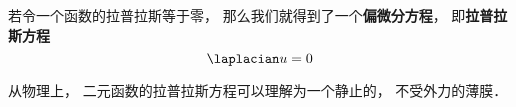 

若令一个函数的拉普拉斯等于零， 那么我们就得到了一个\textbf{偏微分方程}，%
 即\textbf{拉普拉斯方程}
\begin{equation}
\laplacian u = 0
\end{equation}

从物理上， 二元函数的拉普拉斯方程可以理解为一个静止的， 不受外力的薄膜．
